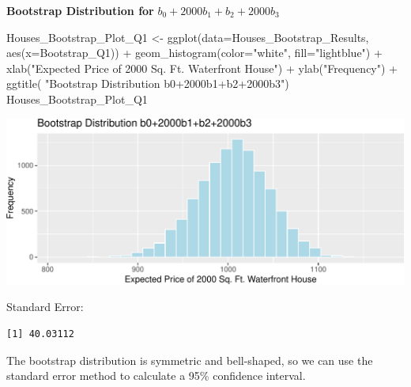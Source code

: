 \documentclass[
  letterpaper,
  DIV=11,
  numbers=noendperiod]{scrreprt}
\newenvironment{Shaded}{\begin{snugshade}}{\end{snugshade}}
\newcommand{\AttributeTok}[1]{\textcolor[rgb]{0.40,0.45,0.13}{#1}}
\newcommand{\FunctionTok}[1]{\textcolor[rgb]{0.28,0.35,0.67}{#1}}
\newcommand{\NormalTok}[1]{\textcolor[rgb]{0.00,0.23,0.31}{#1}}
\newcommand{\OtherTok}[1]{\textcolor[rgb]{0.00,0.23,0.31}{#1}}
\newcommand{\SpecialCharTok}[1]{\textcolor[rgb]{0.37,0.37,0.37}{#1}}
\newcommand{\StringTok}[1]{\textcolor[rgb]{0.13,0.47,0.30}{#1}}
\begin{document}
\textbf{Bootstrap Distribution for} \(b_0 + 2000b_1 + b_2 + 2000b_3\)

\begin{Shaded}
\begin{Highlighting}[]
\NormalTok{Houses\_Bootstrap\_Plot\_Q1 }\OtherTok{\textless{}{-}} \FunctionTok{ggplot}\NormalTok{(}\AttributeTok{data=}\NormalTok{Houses\_Bootstrap\_Results, }
                                   \FunctionTok{aes}\NormalTok{(}\AttributeTok{x=}\NormalTok{Bootstrap\_Q1)) }\SpecialCharTok{+}  
  \FunctionTok{geom\_histogram}\NormalTok{(}\AttributeTok{color=}\StringTok{"white"}\NormalTok{, }\AttributeTok{fill=}\StringTok{"lightblue"}\NormalTok{) }\SpecialCharTok{+} 
  \FunctionTok{xlab}\NormalTok{(}\StringTok{"Expected Price of 2000 Sq. Ft. Waterfront House"}\NormalTok{) }\SpecialCharTok{+} \FunctionTok{ylab}\NormalTok{(}\StringTok{"Frequency"}\NormalTok{) }\SpecialCharTok{+}
  \FunctionTok{ggtitle}\NormalTok{( }\StringTok{"Bootstrap Distribution b0+2000b1+b2+2000b3"}\NormalTok{) }
\NormalTok{Houses\_Bootstrap\_Plot\_Q1}
\end{Highlighting}
\end{Shaded}

\includegraphics{Ch3_files/figure-pdf/unnamed-chunk-160-1.pdf}

Standard Error:

\begin{Shaded}
\end{Shaded}

\begin{verbatim}
[1] 40.03112
\end{verbatim}

The bootstrap distribution is symmetric and bell-shaped, so we can use
the standard error method to calculate a 95\% confidence interval.
\end{document}

